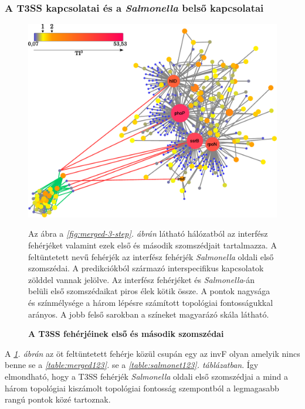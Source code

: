 \documentclass[a4paper,12pt]{article}
\newenvironment{imgdesc}{
		\small
		\singlespacing
		\begin{center}
		
	}{
		\end{center}	
	}
\begin{document}
		\subsubsection{A T3SS kapcsolatai és a \textit{Salmonella} belső kapcsolatai}
		
		\begin{figure}[H]
			\includegraphics[scale=0.6]{img/t3ss-inner-salmonella.pdf}
			\centering
			\caption{ \textbf{A T3SS fehérjéinek első és második szomszédai}}
			\begin{imgdesc}
				Az ábra a \textit{\ref{fig:merged-3-step}. ábrán} látható hálózatból az interfész fehérjéket valamint ezek első és második szomszédjait tartalmazza. A feltüntetett nevű fehérjék az interfész fehérjék \textit{Salmonella} oldali első szomszédai. A predikciókból származó interspecifikus kapcsolatok zölddel vannak jelölve. Az interfész fehérjéket és \textit{Salmonella}-án belüli első szomszédaikat piros élek kötik össze. A pontok nagysága és színmélysége a három lépésre számított topológiai fontosságukkal arányos. A jobb felső sarokban a színeket magyarázó skála látható.
			\end{imgdesc}
			\label{fig:t3ss_inner}			 		 
		\end{figure}

		A \textit{\ref{fig:t3ss_inner}. ábrán} az öt feltüntetett fehérje közül csupán egy az invF olyan amelyik nincs benne se a \textit{\ref{table:merged123}.} se a \textit{\ref{table:salmonet123}. táblázatban}. Így elmondható, hogy a T3SS fehérjék \textit{Salmonella} oldali első szomszédjai a mind a három topológiai kiszámolt topológiai fontosság szempontból a legmagasabb rangú pontok közé tartoznak.
\end{document}
